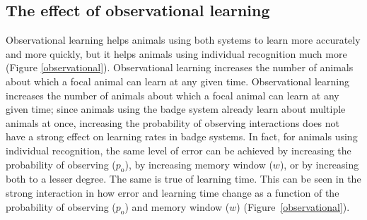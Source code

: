 \subsection*{The effect of observational learning}
Observational learning helps animals using both systems to learn more accurately and more quickly, but it helps animals using individual recognition much more (Figure \ref{observational}). Observational learning increases the number of animals about which a focal animal can learn at any given time. 
Observational learning increases the number of animals about which a focal animal can learn at any given time; since animals using the badge system already learn about multiple animals at once, increasing the probability of observing interactions does not have a strong effect on learning rates in badge systems.
In fact, for animals using individual recognition, the same level of error can be achieved by increasing the probability of observing ($p_\text{o}$), by increasing memory window ($w$), or by increasing both to a lesser degree. The same is true of learning time. This can be seen in the strong interaction in how error and learning time change as a function of the probability of observing ($p_\text{o}$) and memory window ($w$) (Figure~\ref{observational}).


